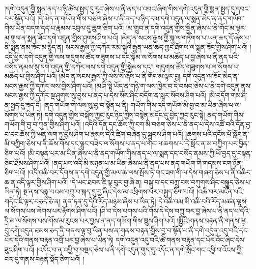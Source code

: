 །དགེ་འདུན་གྱི་སྨན་ནད་པ་ཉི་ཚེས་སྤྱད་དུ་རུང་ཞེས་པ་ནི་ནད་པ་འབའ་ཞིག་གིས་དགེ་འདུན་གྱི་སྨན་སྤྱད་དུ་དབང་བར་སྟོན་པའོ། །དེ་མེད་ན་གཡོག་གིས་བཙལ་ཞེས་པ་ནི་ནད་པ་ཉིད་དམ་དགེ་འདུན་ལ་སྨན་མེད་ན་ནད་གཡོག་གིས་ཡོན་བདག་དད་པ་རྣམས་འབུལ་དུ་ཆུག་ཅིག་པའོ། །མ་གྲུབ་ན་དགེ་འདུན་གྱིས་སྦྱིན་ཞེས་པ་ནི་གོང་མ་ལྟར་མ་གྲུབ་ན་སྨན་ཟོང་དགེ་འདུན་གྱིས་ཤུགས་ཤིག་པའོ། །མེད་ན་སངས་རྒྱས་ཀྱི་སྐུ་ལ་གཏོགས་པ་ཡན་ཆད་དོ་ཞེས་པ་ནི་སྨན་ནམ་ཟོང་མ་རྙེད་ན། སངས་རྒྱས་ཀྱི་དཀོར་རམ་སྐུའི་རྒྱན་ཡན་ཆད་ཀྱང་ཐོགས་ལ་སྨན་ཟོང་གྱིས་ཤིག་པའོ། །འདི་ཕྱིར་དགེ་འདུན་གྱི་ལས་གདུགས་ཚོད་གཟུགས་པ་དང་སྐོམ་ལ་སོགས་པ་མཆོད་པ་བྱ་ཞེས་པ་ནི་ནད་པའི་བསོད་ནམས་སུ་དགེ་འདུན་གྱི་དཀོར་ལས་དགེ་འདུན་གྱི་སྐྱེམས་དང་། གདུགས་ཚོད་གཟུགས་པ་ལ་སོགས་པ་མཆོད་པ་གྱིས་ཤིག་པའོ། །མེད་ན་སངས་རྒྱས་ཀྱི་ལས་སོ་ཞེས་པ་ནི་གོང་མ་ལྟར་བྱ། དགེ་འདུན་ལ་ཟོང་མེད་ན་སངས་རྒྱས་ཀྱི་དཀོར་ལས་གྱིས་ཤིག་པའོ། །མ་ཤི་སྟེ་ཡོད་ན་གཉི་ག་ལས་ཁྱེར་བ་དེ་བསབ་ཅེས་པ་ནི་དགེ་འདུན་ནས་སངས་རྒྱས་ཀྱི་དཀོར་སྔ་ཤུགས་སུ་བྱས་པ་ནད་པ་དེས་སོས་ཤིང་བདོག་ན་སླར་སོབས་ཤིག་པའོ། །མི་བདོག་གམ་ཤི་ན་སྤྱད་དུ་ཟད་དོ། །ནད་གཡོག་གི་ལས་སུ་བྱ་བ་སྟོན་པ་ནི། གཡོག་གིས་འདི་གཡོག་མི་བྱ་བ་མ་ཡིན་ཞེས་པ་ལ་སོགས་པ་ཡིན་ཏེ། དགེ་འདུན་གྱིས་བསྐོས་ཀྱང་རུང་ཉིད་ཀྱིས་བསྙེན་མདོང་དུ་བྱེད་ཀྱང་རུང་སྟེ། ནད་གཡོག་གིས་གཡོག་གི་བྱ་བ་ཀུན་གྱིས་ཤིག་པའོ། །འདིའི་དོན་དང་ཆོས་ཀྱི་ངག་མི་བཅག་ཅེས་པ་ནི་ནད་པ་དེས་འཚོ་བའི་དོན་བྱ་བ་དང་ཆོས་ཀྱི་ཡན་ལག་ཏུ་བྱོས་ཤིག་པ་རྣམས་དེའི་ཚིག་བཞིན་དུ་སྒྲུབས་ཤིག་པའོ། །ཆགས་པའི་དངོས་པོ་སློང་ན་མི་བཀྱིག་ཅེས་པ་ནི་ཆོས་གོས་དང་ལྷུང་བཟེད་ལ་སོགས་པ་ནད་པ་གང་ལ་ཆགས་པ་དེ་སློང་ན་མ་བཀྱིག་པར་བྱིན་ཅིག་པའོ། །མི་བསྟན་པར་མ་ཡིན་ཞེས་པ་ནི་ནད་གཡོག་གིས་ནད་པ་ལ་སྨན་དང་བསོད་ནམས་ཀྱི་ཡོ་བྱད་དུ་བསྟན་ཅིང་ཐོམས་ཤིག་པའོ། །ནད་པས་འདི་མི་མཉན་པ་མ་ཡིན་ཞེས་པ་ནི་ནད་པས་ནད་གཡོག་གི་གདམས་ངག་ཉོན་ཅིག་པའོ། །འདི་འཆི་བར་དོགས་ན་དགེ་འདུན་གྱི་མལ་ཆ་ལས་སྤོས་ཏེ་གང་ཟག་གི་ལ་དེས་གཞག་ཅེས་པ་ནི་འཆིར་ཆ་ན་འདི་ལྟར་གྱིས་ཤིག་པའོ། །དེ་ཡང་ཐབས་ཇི་ལྟ་བུར་བྱ་ཞེ་ན། བསྐུ་བ་དང་བཀྲུ་བས་བཀུགས་ཤིང་བསྐྱུད་ཅེས་པ་ཡིན་ཏེ། སྔ་ནས་བསྐུ་བའམ་བཀྲུ་བ་སྐད་དུ་བྱ་ཞིང་དེས་མ་འཕྲིགས་པར་བསྐྱུད་ཅིག་པའོ། །འཆི་བར་མངོན་པའི་གདེང་ཇི་ལྟར་བཅད་ཅེ་ན། ནན་ཏན་དུ་དེའི་རོད་མཉམ་ཞེས་པ་ཡིན་ཏེ། དེ་འཆི་འམ་མི་འཆི་བའི་རོད་མཚན་ལྟས་ལ་སོགས་པས་ལེགས་པར་རྟོགས་ཤིག་པའོ། །ཤི་བ་དེས་པགས་པའི་གོས་དེ་དེས་བཀྲུ་བར་བྱ་ཞེས་པ་ནི་ནད་པ་དེའི་དྲི་མ་ལ་སོགས་པས་གོས་མ་རུངས་པར་བྱས་ན་ནད་གཡོག་གིས་ཁྲུས་ཤིག་པའོ། །སྤྱིའི་གནས་བརྟན་ནི་གནས་ལྟ་བུ་དགེ་འདུན་ཐམས་ཅད་ནི་གནས་ལྟ་བུ་ཡིན་པས་ན་གནས་བརྟན་གྱིས་བྱ་བ་སྟོན་པ་ནི་དགེ་འདུན་འདུ་བའི་དང་པོར་དེའི་གནས་བརྟན་འགྲོ་པར་བྱ་ཞེས་པ་ཡིན་ཏེ། དགེ་འདུན་འདུ་བའི་ཚེ་གནས་བརྟན་དང་པོར་འོང་ཞིང་དེས་ཟུང་ཤིག་པའོ། །འདོང་བ་ན་འཕྱི་བ་བསྡད་ཅེས་པ་ནི་དགེ་འདུན་གུད་དུ་འདོང་ན་དགེ་སློང་གང་འཕྱི་བ་འོངས་ཀྱི་བར་དུ་གནས་བརྟན་སྡོད་ཅིག་པའོ། །
